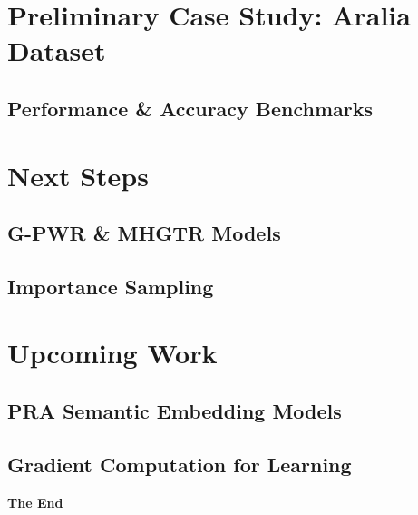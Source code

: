 \documentclass[aspectratio=169,xcolor=dvipsnames]{beamer}
\begin{document}
\section{Preliminary Case Study: Aralia Dataset}
\subsection{Performance \& Accuracy Benchmarks}

\section{Next Steps}
\subsection{G-PWR \& MHGTR Models}
\subsection{Importance Sampling}

\section{Upcoming Work}
\subsection{PRA Semantic Embedding Models}
\subsection{Gradient Computation for Learning}

% 
% 
% 
% 
% 
% 

%     
%     


\begin{frame}
    \Huge{\centerline{\textbf{The End}}}
\end{frame}

\end{document}
